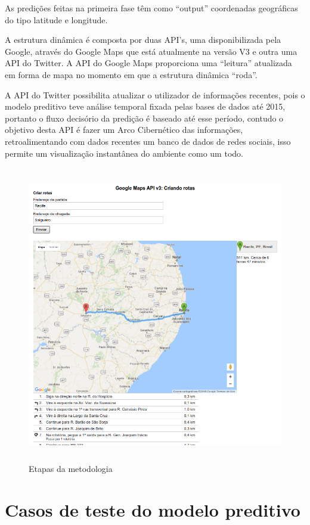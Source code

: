 As predições feitas na primeira fase têm como ``output'' coordenadas geográficas do tipo latitude e longitude.

A estrutura dinâmica é composta por duas API's, uma disponibilizada pela Google, através do Google Maps que está atualmente na versão V3 e 
outra uma API do Twitter. A API do Google Maps proporciona uma ``leitura'' atualizada em forma de mapa no momento em que a estrutura dinâmica ``roda''.

A API do Twitter possibilita atualizar o utilizador de informações recentes, pois o modelo preditivo teve análise temporal fixada 
pelas bases de dados até 2015, portanto o fluxo decisório da predição é baseado até esse período, contudo o objetivo desta API é fazer 
um Arco Cibernético das informações, retroalimentando com dados recentes um banco de dados de redes sociais, isso permite um visualização 
instantânea do ambiente como um todo.

\begin{figure}[ht]
\centering
\caption{Etapas da metodologia}
\includegraphics[width=150mm, height=130mm]{Figuras/Cronograma/GoogleMaps.png}
\end{figure}

\pagebreak

\section{Casos de teste do modelo preditivo}